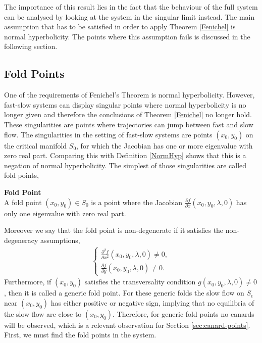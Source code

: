 The importance of this result lies in the fact that the behaviour of the full system can be analysed by looking at the system in the singular limit instead. The main assumption that has to be satisfied in order to apply Theorem \ref{Fenichel} is normal hyperbolicity. The points where this assumption fails is discussed in the following section.

\subsection{Fold Points}\label{sec:singularitiesandfoldpoints}
One of the requirements of Fenichel's Theorem is normal hyperbolicity. However, fast-slow systems can display singular points where normal hyperbolicity is no longer given and therefore the conclusions of Theorem \ref{Fenichel} no longer hold. These singularities are points where trajectories can jump between fast and slow flow. The singularities in the setting of fast-slow systems are points $(x_0,y_0)$ on the critical manifold $S_0$, for which the Jacobian has one or more eigenvalue with zero real part. Comparing this with Definition \ref{NormHyp} shows that this is a negation of normal hyperbolicity. The simplest of those singularities are called fold points,
\begin{definition}{\textbf{Fold Point}} \label{FoldDef} \\
	A fold point $(x_0,y_0) \in S_0$ is a point where the Jacobian $ \frac{\partial f}{\partial x}(x_0,y_0, \lambda, 0)$ has only one eigenvalue with zero real part.
\end{definition}
Moreover we say that the fold point is non-degenerate if it satisfies the non-degeneracy assumptions,
\begin{align} \label{NonDeg}
\begin{cases}
\frac{ \partial ^2 f}{ \partial x^2} (x_0,y_0, \lambda, 0) \neq 0, \\
\frac{\partial f}{\partial y}(x_0,y_0, \lambda, 0) \neq 0.
\end{cases}
\end{align}
Furthermore, if $(x_0,y_0)$ satisfies the transversality condition $g(x_0,y_0, \lambda, 0) \neq 0$, then it is called a generic fold point. For these generic folds the slow flow on $S_\epsilon$ near $(x_0,y_0)$ has either positive or negative sign, implying that no equilibria of the slow flow are close to $(x_0,y_0)$. Therefore, for generic fold points no canards will be observed, which is a relevant observation for Section \ref{sec:canard-points}. First, we must find the fold points in the system.\\
